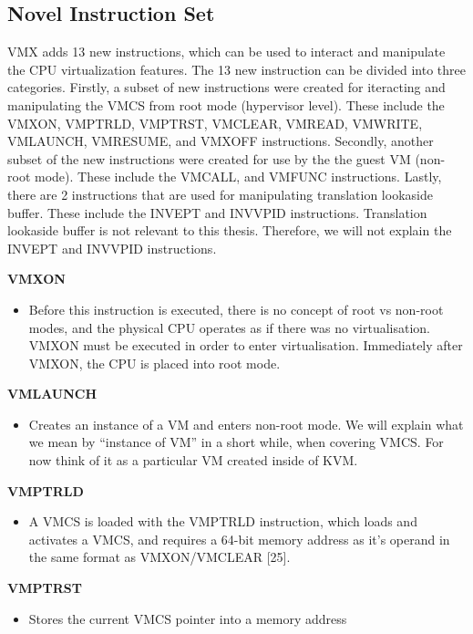 \documentclass{report}
\begin{document}
\begin{spacing}{1.5}
\subsection{Novel Instruction Set}

{\large
VMX adds 13 new instructions, which can be used to interact and manipulate the CPU virtualization features. The 13 new instruction can be divided into three categories. Firstly, a subset of new instructions were created for iteracting and manipulating the VMCS from root mode (hypervisor level). These include the VMXON, VMPTRLD, VMPTRST, VMCLEAR, VMREAD, VMWRITE, VMLAUNCH, VMRESUME, and VMXOFF instructions. Secondly, another subset of the new instructions were created for use by the the guest VM (non-root mode). These include the VMCALL, and VMFUNC instructions. Lastly, there are 2 instructions that are used for manipulating translation lookaside buffer. These include the INVEPT and INVVPID instructions. Translation lookaside buffer is not relevant to this thesis. Therefore, we will not explain the INVEPT and INVVPID instructions.
\newline
}

{\large

\textbf{VMXON}
\begin{itemize}
\item[] Before this instruction is executed, there is no concept of root vs non-root modes, and the physical CPU operates as if there was no virtualisation. VMXON must be executed in order to enter virtualisation. Immediately after VMXON, the CPU is placed into root mode.
\end{itemize}

\textbf{VMLAUNCH}
\begin{itemize}
\item[] Creates an instance of a VM and enters non-root mode. We will explain what we mean by “instance of VM” in a short while, when covering VMCS. For now think of it as a particular VM created inside of KVM.
\end{itemize}

\textbf{VMPTRLD}
\begin{itemize}
\item[] A VMCS is loaded with the VMPTRLD instruction, which loads and activates a VMCS, and requires a 64-bit memory address as it's operand in the same format as VMXON/VMCLEAR [25].
\end{itemize}

\textbf{VMPTRST}
\begin{itemize}
\item[] {\large Stores the current VMCS pointer into a memory address}
\end{itemize}

}
\end{spacing}
\end{document}
